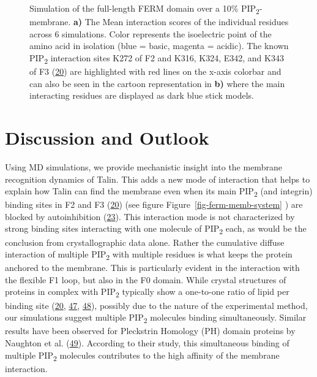\documentclass[
  twocolumn]{biophys-new-mod}
\begin{document}
\begin{figure}
\begin{minipage}[t]{\linewidth}
{{}

}

\subcaption{\label{fig-ferm-memb-system}~}
\end{minipage}%

\caption{\label{fig-ferm-further}Simulation of the full-length FERM
domain over a 10\% PIP\textsubscript{2}-membrane. \textbf{a)} The Mean
interaction scores of the individual residues across 6 simulations.
Color represents the isoelectric point of the amino acid in isolation
(blue = basic, magenta = acidic). The known PIP\textsubscript{2}
interaction sites K272 of F2 and K316, K324, E342, and K343 of F3
(\protect\hyperlink{ref-chinthalapudiInteractionTalinCell2018a}{20}) are
highlighted with red lines on the x-axis colorbar and can also be seen
in the cartoon representation in \textbf{b)} where the main interacting
residues are displayed as dark blue stick models.}

\end{figure}

\hypertarget{discussion-and-outlook}{%
\section{Discussion and Outlook}\label{discussion-and-outlook}}

Using MD simulations, we provide mechanistic insight into the membrane
recognition dynamics of Talin. This adds a new mode of interaction that
helps to explain how Talin can find the membrane even when its main
PIP\textsubscript{2} (and integrin) binding sites in F2 and F3
(\protect\hyperlink{ref-chinthalapudiInteractionTalinCell2018a}{20})
(see figure Figure~\ref{fig-ferm-memb-system} ) are blocked by
autoinhibition
(\protect\hyperlink{ref-deddenArchitectureTalin1Reveals2019a}{23}). This
interaction mode is not characterized by strong binding sites
interacting with one molecule of PIP\textsubscript{2} each, as would be
the conclusion from crystallographic data alone. Rather the cumulative
diffuse interaction of multiple PIP\textsubscript{2} with multiple
residues is what keeps the protein anchored to the membrane. This is
particularly evident in the interaction with the flexible F1 loop, but
also in the F0 domain. While crystal structures of proteins in complex
with PIP\textsubscript{2} typically show a one-to-one ratio of lipid per
binding site
(\protect\hyperlink{ref-chinthalapudiInteractionTalinCell2018a}{20},
\protect\hyperlink{ref-chinthalapudiLipidBindingPromotes2018}{47},
\protect\hyperlink{ref-jianMolecularBasisCooperative2015}{48}), possibly
due to the nature of the experimental method, our simulations suggest
multiple PIP\textsubscript{2} molecules binding simultaneously. Similar
results have been observed for Pleckstrin Homology (PH) domain proteins
by Naughton et al.
(\protect\hyperlink{ref-naughtonModesInteractionPleckstrin2018}{49}).
According to their study, this simultaneous binding of multiple
PIP\textsubscript{2} molecules contributes to the high affinity of the
membrane interaction.
\end{document}
